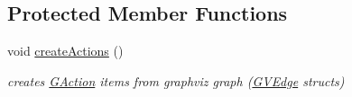 \subsection*{Protected Member Functions}
\begin{DoxyCompactItemize}
\item 
\hypertarget{classPHScene_a63a2e3d0f466494e545d2d8d9dea1e86}{void \hyperlink{classPHScene_a63a2e3d0f466494e545d2d8d9dea1e86}{create\+Actions} ()}\label{classPHScene_a63a2e3d0f466494e545d2d8d9dea1e86}

\begin{DoxyCompactList}\small\item\em creates \hyperlink{classGAction}{G\+Action} items from graphviz graph (\hyperlink{structGVEdge}{G\+V\+Edge} structs) \end{DoxyCompactList}\end{DoxyCompactItemize}
